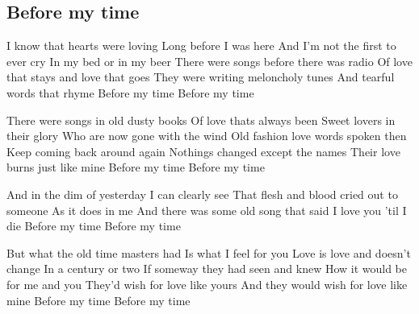 \subsection*{Before my time   }



\begin{guitar}
I know that hearts were loving
Long before I was here
And I'm not the first to ever cry
In my bed or in my beer
There were songs before there was radio
Of love that stays and love that goes
They were writing meloncholy tunes
And tearful words that rhyme
Before my time
Before my time

There were songs in old dusty books
Of love thats always been
Sweet lovers in their glory
Who are now gone with the wind
Old fashion love words spoken then
Keep coming back around again
Nothings changed except the names
Their love burns just like mine
Before my time
Before my time

And in the dim of yesterday
I can clearly see
That flesh and blood cried out to someone
As it does in me
And there was some old song that said
I love you 'til I die
Before my time
Before my time

But what the old time masters had
Is what I feel for you
Love is love and doesn't change
In a century or two
If someway they had seen and knew
How it would be for me and you
They'd wish for love like yours
And they would wish for love like mine
Before my time
Before my time
\end{guitar}
